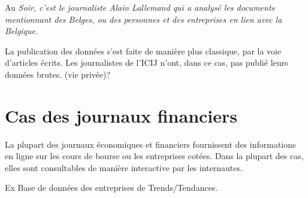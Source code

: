 Au \em Soir\em, c'est le journaliste Alain Lallemand qui a analysé les documents mentionnant des Belges, ou des personnes et des entreprises en lien avec la Belgique.

La publication des données s'est faite de manière plus classique, par la voie d'articles écrits. Les journalistes de l'ICIJ n'ont, dans ce cas, pas publié leurs données brutes. (vie privée)?

\section{Cas des journaux financiers}

La plupart des journaux économiques et financiers fournissent des informations en ligne sur les cours de bourse ou les entreprises cotées. Dans la plupart des cas, elles sont consultables de manière interactive par les internautes.

Ex Base de données des entreprises de Trends/Tendances.